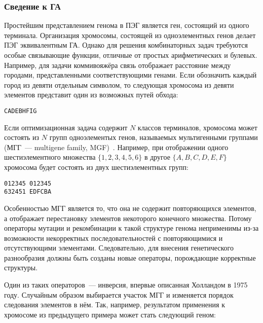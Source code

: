 


\subsubsection{Сведение к ГА}

Простейшим представлением генома в ПЭГ является ген, состоящий из одного терминала. Организация хромосомы, состоящей из одноэлементных генов делает ПЭГ эквивалентным ГА. Однако для решения комбинаторных задач требуются особые связывающие функции, отличные от простых арифметических и булевых. Например, для задачи коммивояжёра связь отображает расстояние между городами, представленными соответствующими генами. Если обозначить каждый город из девяти отдельным символом, то следующая хромосома из девяти элементов представит один из возможных путей обхода:

\begin{verbatim}
CADEBHFIG
\end{verbatim}

Если оптимизационная задача содержит $N$ классов терминалов, хромосома может состоять из $N$ групп одноэлементых генов, называемых мультигенными группами (МГГ~--- multigene family, MGF)~\cite{ferreira:2002:ASIA}. Например, при отображении одного шестиэлементного множества $\{1, 2, 3, 4, 5, 6\}$ в другое $\{A, B, C, D, E, F\}$ хромосома будет состоять из двух шестиэлементных групп:

\begin{samepage}
\begin{verbatim}
012345 012345
632451 EDFCBA
\end{verbatim}
\end{samepage}

Особенностью МГГ является то, что она не содержит повторяющихся элементов, а отображает перестановку элементов некоторого конечного множества. Потому операторы мутации и рекомбинации к такой структуре генома неприменимы из-за возможности некорректных последовательностей с повторяющимися и отсутствующими элементами. Следовательно, для внесения генетического разнообразия должны быть созданы новые операторы, порождающие корректные структуры.

Один из таких операторов~--- инверсия, впервые описанная Холландом в 1975 году. Случайным образом выбирается участок МГГ и изменяется порядок следования элементов в нём. Так, например, результатом применения к хромосоме из предыдущего примера может стать следующий геном:

